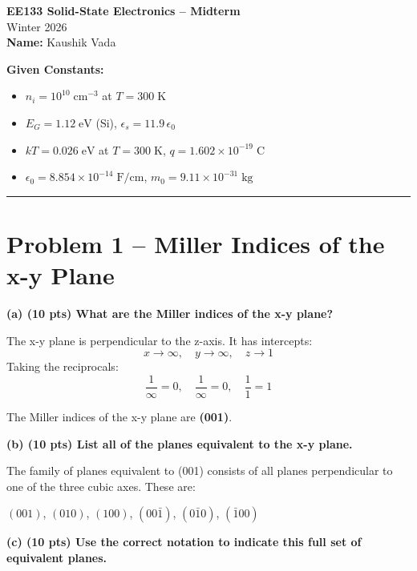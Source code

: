 \documentclass[11pt]{article}
\begin{document}
\begin{center}
  {\LARGE \textbf{EE133 Solid-State Electronics -- Midterm}} \\[6pt]
  {\large Winter 2026} \\[6pt]
  \textbf{Name:} Kaushik Vada
\end{center}

\vspace{4pt}
\textbf{Given Constants:}
\begin{itemize}[nosep]
  \item $n_i = 10^{10}\;\text{cm}^{-3}$ at $T = 300\;\text{K}$
  \item $E_G = 1.12\;\text{eV}$ (Si), $\epsilon_s = 11.9\,\epsilon_0$
  \item $kT = 0.026\;\text{eV}$ at $T = 300\;\text{K}$, $q = 1.602 \times 10^{-19}\;\text{C}$
  \item $\epsilon_0 = 8.854 \times 10^{-14}\;\text{F/cm}$, $m_0 = 9.11 \times 10^{-31}\;\text{kg}$
\end{itemize}

\hrule
\vspace{8pt}

\section*{Problem 1 -- Miller Indices of the x-y Plane}

\textbf{(a) (10 pts) What are the Miller indices of the x-y plane?}

The x-y plane is perpendicular to the z-axis. It has intercepts:
\[
  x \to \infty, \quad y \to \infty, \quad z \to 1
\]
Taking the reciprocals:
\[
  \frac{1}{\infty} = 0, \quad \frac{1}{\infty} = 0, \quad \frac{1}{1} = 1
\]

\begin{answerbox}
  The Miller indices of the x-y plane are \textbf{(001)}.
\end{answerbox}

\textbf{(b) (10 pts) List all of the planes equivalent to the x-y plane.}

The family of planes equivalent to (001) consists of all planes perpendicular to one of the three cubic axes. These are:

\begin{answerbox}
  $(001)$, $(010)$, $(100)$, $(00\bar{1})$, $(0\bar{1}0)$, $(\bar{1}00)$
\end{answerbox}

\textbf{(c) (10 pts) Use the correct notation to indicate this full set of equivalent planes.}
\end{document}
